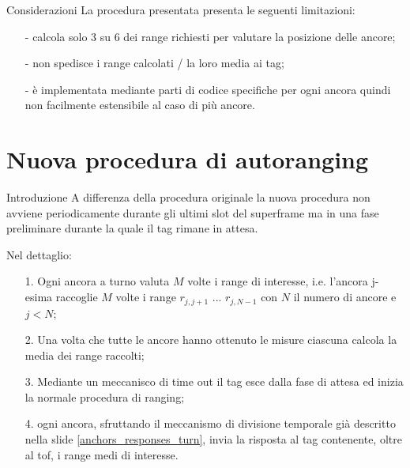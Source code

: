\begin{frame}{Considerazioni}
  La procedura presentata presenta le seguenti limitazioni:
  \begin{itemize}
  \item [-] calcola solo 3 su 6 dei range richiesti per valutare la posizione delle ancore;
  \item [-] non spedisce i range calcolati / la loro media ai tag;
  \item [-] è implementata mediante parti di codice specifiche per ogni ancora quindi \alert{non}
    facilmente estensibile al caso di più ancore.
  \end{itemize}
\end{frame}

\section{Nuova procedura di autoranging}

\begin{frame}[shrink = 10]{Introduzione}
  A differenza della procedura originale la nuova procedura \alert{non} avviene periodicamente
  durante gli ultimi slot del superframe ma in una fase preliminare durante la quale il tag rimane in attesa.
  \par
  Nel dettaglio:
  \begin{itemize}
  \item [1.] Ogni ancora \alert{a turno} valuta $M$ volte i range di interesse, i.e. l'ancora
    j-esima raccoglie $M$ volte i range $r_{j,j+1}$ ... $r_{j,N-1}$ con $N$ il numero di ancore e $j<N$;
  \item [2.] Una volta che tutte le ancore hanno ottenuto le misure ciascuna calcola la media dei range raccolti;
  \item [3.] Mediante un meccanisco di time out il tag esce dalla fase di attesa ed inizia la normale procedura di ranging;
  \item [4.] ogni ancora, sfruttando il meccanismo di divisione temporale già descritto nella slide \ref{anchors_responses_turn},
    invia la risposta al tag contenente, oltre al tof, i range medi di interesse.
  \end{itemize}
\end{frame}

